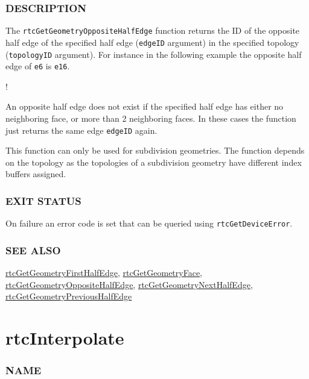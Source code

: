 \subsubsection{DESCRIPTION}\label{description}

The \texttt{rtcGetGeometryOppositeHalfEdge} function returns the ID of
the opposite half edge of the specified half edge (\texttt{edgeID}
argument) in the specified topology (\texttt{topologyID} argument). For
instance in the following example the opposite half edge of \texttt{e6}
is \texttt{e16}.

!\href{images/half_edges.pdf}{}

An opposite half edge does not exist if the specified half edge has
either no neighboring face, or more than 2 neighboring faces. In these
cases the function just returns the same edge \texttt{edgeID} again.

This function can only be used for subdivision geometries. The function
depends on the topology as the topologies of a subdivision geometry have
different index buffers assigned.

\subsubsection{EXIT STATUS}\label{exit-status}

On failure an error code is set that can be queried using
\texttt{rtcGetDeviceError}.

\subsubsection{SEE ALSO}\label{see-also}

\hyperref[rtcgetgeometryfirsthalfedge]{rtcGetGeometryFirstHalfEdge},
\hyperref[rtcgetgeometryface]{rtcGetGeometryFace},
\hyperref[rtcgetgeometryoppositehalfedge]{rtcGetGeometryOppositeHalfEdge},
\hyperref[rtcgetgeometrynexthalfedge]{rtcGetGeometryNextHalfEdge},
\hyperref[rtcgetgeometryprevioushalfedge]{rtcGetGeometryPreviousHalfEdge}

\pagebreak

\section{rtcInterpolate}\label{rtcinterpolate}

\subsubsection{NAME}\label{name}

